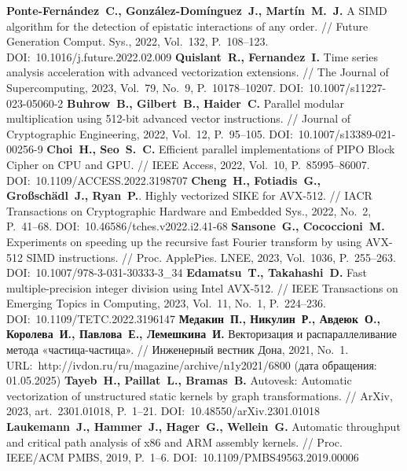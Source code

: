 \begin{thebibliography}{99}
\textbf{Ponte-Fern{\'a}ndez~C., Gonz{\'a}lez-Dom{\'i}nguez~J., Mart{\'i}n~M.~J.} A SIMD algorithm for the detection of epistatic interactions of any order. // Future Generation Comput. Sys., 2022, Vol.~132, P.~108–123. DOI:~10.1016/j.future.2022.02.009
\textbf{Quislant~R., Fernandez~I.} Time series analysis acceleration with advanced vectorization extensions. // The Journal of Supercomputing, 2023, Vol.~79, No.~9, P.~10178–10207. DOI:~10.1007/s11227-023-05060-2
\textbf{Buhrow~B., Gilbert~B., Haider~C.} Parallel modular multiplication using 512-bit advanced vector instructions. // Journal of Cryptographic Engineering, 2022, Vol.~12, P.~95–105. DOI:~10.1007/s13389-021-00256-9
\textbf{Choi~H., Seo~S.~C.} Efficient parallel implementations of PIPO Block Cipher on CPU and GPU. // IEEE Access, 2022, Vol.~10, P.~85995–86007. DOI:~10.1109/ACCESS.2022.3198707
\textbf{Cheng~H., Fotiadis~G., Gro{\ss}sch{\"a}dl~J., Ryan~P.}. Highly vectorized SIKE for AVX-512. // IACR Transactions on Cryptographic Hardware and Embedded Sys., 2022, No.~2, P.~41–68. DOI:~10.46586/tches.v2022.i2.41-68
\textbf{Sansone~G., Cococcioni~M.} Experiments on speeding up the recursive fast Fourier transform by using AVX-512 SIMD instructions. // Proc. ApplePies. LNEE, 2023, Vol.~1036, P.~255–263. DOI:~10.1007/978-3-031-30333-3\_34
\textbf{Edamatsu~T., Takahashi~D.} Fast multiple-precision integer division using Intel AVX-512. // IEEE Transactions on Emerging Topics in Computing, 2023, Vol.~11, No.~1, P.~224–236. DOI:~10.1109/TETC.2022.3196147
\textbf{Медакин~П., Никулин~Р., Авдеюк~О., Королева~И., Павлова~Е., Лемешкина~И.} Векторизация и распараллеливание метода «частица-частица». // Инженерный вестник Дона, 2021, No.~1. URL:~http://ivdon.ru/ru/magazine/archive/n1y2021/6800 (дата обращения: 01.05.2025)
\textbf{Tayeb~H., Paillat~L., Bramas~B.} Autovesk: Automatic vectorization of unstructured static kernels by graph transformations. // ArXiv, 2023, art.~2301.01018, P.~1–21. DOI:~10.48550/arXiv.2301.01018
\textbf{Laukemann~J., Hammer~J., Hager~G., Wellein~G.} Automatic throughput and critical path analysis of x86 and ARM assembly kernels. // Proc. IEEE/ACM PMBS, 2019, P.~1–6. DOI:~10.1109/PMBS49563.2019.00006


\end{thebibliography}
